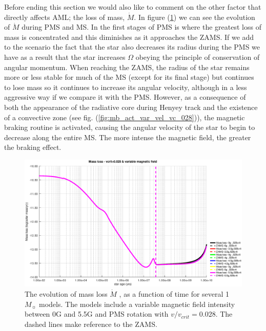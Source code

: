 \documentclass[fleqn,usenatbib]{mnras}
\begin{document}
Before ending this section we would also like to comment on the other factor that directly affects AML; the loss of mass, $\Dot{M}$. In figure (\ref{fig:mdot_vc_028_var_b}) we can see the evolution of $\Dot{M}$ during PMS and MS. In the first stages of PMS is where the greatest loss of mass is concentrated and this diminishes as it approaches the ZAMS. If we add to the scenario the fact that the star also decreases its radius during the PMS we have as a result that the star increases $\Omega$ obeying the principle of conservation of angular momentum. When reaching the ZAMS, the radius of the star remains more or less stable for much of the MS (except for its final stage) but continues to lose mass so it continues to increase its angular velocity, although in a less aggressive way if we compare it with the PMS. However, as a consequence of both the appearance of the radiative core during Henyey track and the existence of a convective zone (see fig. (\ref{fig:mb_act_var_vel_vc_028})), the magnetic braking routine is activated, causing the angular velocity of the star to begin to decrease along the entire MS. The more intense the magnetic field, the greater the braking effect.\par 

\begin{figure}
	\includegraphics[width=\columnwidth]{figures/mdot_vc_028_var_b.eps}
    \caption{The evolution of mass loss $\Dot{M}$ , as a function of time for several 1 $M_{\sun}$ models. The models include a variable magnetic field intensity between 0G and 5.5G and PMS rotation with $v/v_{crit}=0.028$. The dashed lines make reference to the ZAMS.}
    \label{fig:mdot_vc_028_var_b}
\end{figure}
\end{document}
